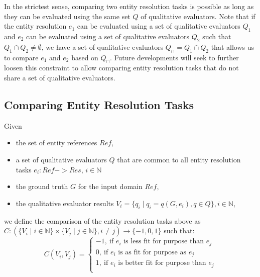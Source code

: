 \documentclass[11pt]{article}
\begin{document}
    In the strictest sense, comparing two entity resolution tasks is possible as
    long as they can be evaluated using the same set $Q$ of qualitative
    evaluators.
    Note that if the entity resolution $e_1$ can be evaluated using a set of
    qualitative evaluators $Q_1$ and $e_2$ can be evaluated using a set of
    qualitative evaluators $Q_2$ such that $Q_1 \cap Q_2 \neq \emptyset$, we
    have a set of qualitative evaluators $Q_\cap = Q_1 \cap Q_2$ that allows us
    to compare $e_1$ and $e_2$ based on $Q_\cap$.
    Future developments will seek to further loosen this constraint to allow
    comparing entity resolution tasks that do not share a set of qualitative
    evaluators.

    \subsection[cert]{Comparing Entity Resolution Tasks}\label{subsec:cert}

    \begin{defn}
        Given
        \begin{itemize}
            \item the set of entity references $Ref$,
            \item a set of qualitative evaluators $Q$ that are common to all
            entity resolution tasks $e_i : Ref -> Res$, $i \in \mathbb{N}$
            \item the ground truth $G$ for the input domain $Ref$,
            \item the qualitative evaluator results $V_i=\{q_{i} \mid q_{i} = q(G, e_i), q \in Q\},
            i \in \mathbb{N}$,
        \end{itemize}   
        we define the comparison of the entity resolution tasks above as
        $C : (
            \{V_i \mid i \in \mathbb{N}\}
            \times
            \{V_j \mid j \in \mathbb{N}\},
            i \neq j
        ) \rightarrow \{-1, 0, 1\}$ such that:
        \[ 
C(V_i, V_j) = \left\{
\begin{array}{ll}
      -1,~\textrm{if $e_i$ is less fit for purpose than $e_j$}\\
      0,~\textrm{if $e_i$ is as fit for purpose as $e_j$}\\
      1,~\textrm{if $e_i$ is better fit for purpose than $e_j$}\\
\end{array} 
\right. 
\]

    \end{defn}
\end{document}
